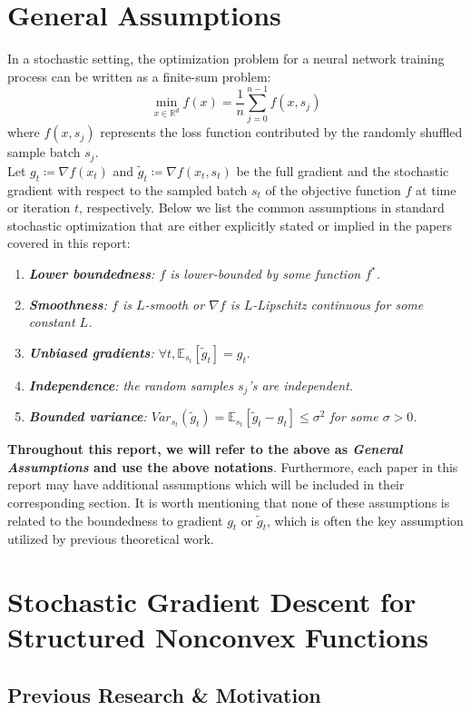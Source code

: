 \documentclass{article}
\begin{document}
\section{General Assumptions}
In a stochastic setting, the optimization problem for a neural network training process can be written as a finite-sum problem:
\[
\min_{x \in \mathbb{R}^d} f(x) = \frac{1}{n}\sum_{j = 0}^{n - 1} f(x, s_j)
\]
where $f(x, s_j)$ represents the loss function contributed by the randomly shuffled sample batch $s_j$.\\
\newline
Let $g_t\coloneqq\nabla f(x_t)$ and $\tilde{g}_t \coloneqq  \nabla f(x_t, s_t)$ be the full gradient and the stochastic gradient with respect to the sampled batch $s_t$ of the objective function $f$ at time or iteration $t$, respectively. Below we list the common assumptions in standard stochastic optimization that are either explicitly stated or implied in the papers covered in this report:
\begin{enumerate}[leftmargin=*]
	\item \textit{\textbf{Lower boundedness}: $f$ is lower-bounded by some function $f^*$.}
	\item \textit{\textbf{Smoothness}: $f$ is $L$-smooth or $\nabla f$ is $L$-Lipschitz continuous for some constant $L$.}
	\item \textit{\textbf{Unbiased gradients}: $\forall t, \mathbb{E}_{s_t}[\tilde{g}_t] = g_t$}.
	\item \textit{\textbf{Independence}: the random samples $s_j$'s are independent.}
	\item \textit{\textbf{Bounded variance}: $Var_{s_t}(\tilde{g}_t) = \mathbb{E}_{s_t}[\tilde{g}_t - g_t] \leq \sigma^2$ for some $\sigma > 0$.}
\end{enumerate}
\textbf{Throughout this report, we will refer to the above as \textit{General Assumptions} and use the above notations}. Furthermore, each paper in this report may have additional assumptions which will be included in their corresponding section. It is worth mentioning that none of these assumptions is related to the boundedness to gradient $g_t$ or $\tilde{g}_t$, which is often the key assumption utilized by previous theoretical work.
\section{Stochastic Gradient Descent for Structured Nonconvex Functions}
\label{section3}
\subsection{Previous Research \& Motivation}
\end{document}
